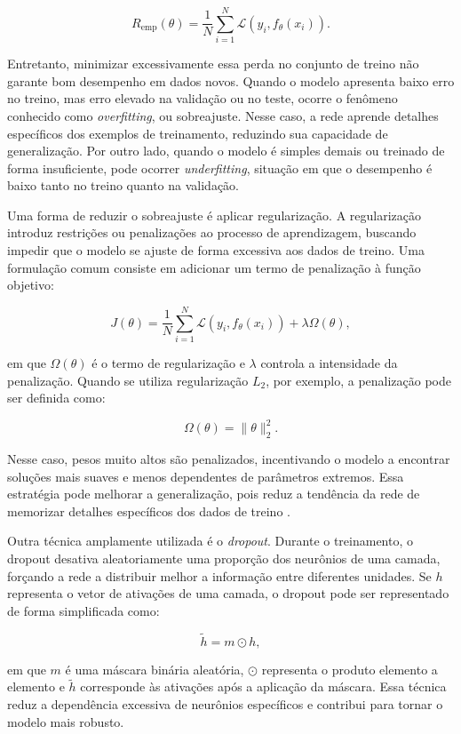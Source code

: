 \documentclass[
    12pt,
    openright,
    oneside,
    a4paper,
    english,
    brazil
]{abntex2}
\begin{document}
\[
R_{\text{emp}}(\theta) =
\frac{1}{N}
\sum_{i=1}^{N}
\mathcal{L}(y_i, f_{\theta}(x_i)).
\]

Entretanto, minimizar excessivamente essa perda no conjunto de treino não garante bom desempenho em dados novos. Quando o modelo apresenta baixo erro no treino, mas erro elevado na validação ou no teste, ocorre o fenômeno conhecido como \textit{overfitting}, ou sobreajuste. Nesse caso, a rede aprende detalhes específicos dos exemplos de treinamento, reduzindo sua capacidade de generalização. Por outro lado, quando o modelo é simples demais ou treinado de forma insuficiente, pode ocorrer \textit{underfitting}, situação em que o desempenho é baixo tanto no treino quanto na validação.

Uma forma de reduzir o sobreajuste é aplicar regularização. A regularização introduz restrições ou penalizações ao processo de aprendizagem, buscando impedir que o modelo se ajuste de forma excessiva aos dados de treino. Uma formulação comum consiste em adicionar um termo de penalização à função objetivo:

\[
J(\theta) =
\frac{1}{N}
\sum_{i=1}^{N}
\mathcal{L}(y_i, f_{\theta}(x_i))
+
\lambda \Omega(\theta),
\]

em que \(\Omega(\theta)\) é o termo de regularização e \(\lambda\) controla a intensidade da penalização. Quando se utiliza regularização \(L_2\), por exemplo, a penalização pode ser definida como:

\[
\Omega(\theta) = \|\theta\|_2^2.
\]

Nesse caso, pesos muito altos são penalizados, incentivando o modelo a encontrar soluções mais suaves e menos dependentes de parâmetros extremos. Essa estratégia pode melhorar a generalização, pois reduz a tendência da rede de memorizar detalhes específicos dos dados de treino \cite{goodfellow2016deep}.

Outra técnica amplamente utilizada é o \textit{dropout}. Durante o treinamento, o dropout desativa aleatoriamente uma proporção dos neurônios de uma camada, forçando a rede a distribuir melhor a informação entre diferentes unidades. Se \(h\) representa o vetor de ativações de uma camada, o dropout pode ser representado de forma simplificada como:

\[
\tilde{h} = m \odot h,
\]

em que \(m\) é uma máscara binária aleatória, \(\odot\) representa o produto elemento a elemento e \(\tilde{h}\) corresponde às ativações após a aplicação da máscara. Essa técnica reduz a dependência excessiva de neurônios específicos e contribui para tornar o modelo mais robusto.
\end{document}
